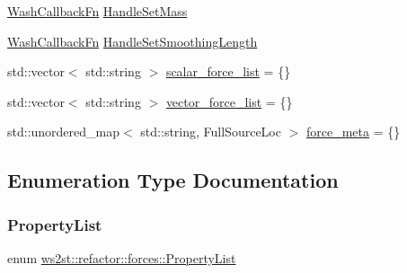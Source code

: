 \begin{DoxyCompactItemize}
\item 
\mbox{\hyperlink{namespacews2st_a682dfda40d8282c7e579a7b826a7d861}{Wash\+Callback\+Fn}} \mbox{\hyperlink{namespacews2st_1_1refactor_1_1forces_af54b981d6a8b8492f6182661addf9144}{Handle\+Set\+Mass}}
\item 
\mbox{\hyperlink{namespacews2st_a682dfda40d8282c7e579a7b826a7d861}{Wash\+Callback\+Fn}} \mbox{\hyperlink{namespacews2st_1_1refactor_1_1forces_a5a98d16b73d023d22729401f6233dccd}{Handle\+Set\+Smoothing\+Length}}
\item 
std\+::vector$<$ std\+::string $>$ \mbox{\hyperlink{namespacews2st_1_1refactor_1_1forces_a72e48f86201c44aef10b6dab331928fa}{scalar\+\_\+force\+\_\+list}} = \{\}
\item 
std\+::vector$<$ std\+::string $>$ \mbox{\hyperlink{namespacews2st_1_1refactor_1_1forces_aeca6bb9c0c85026cbbc964cc3a6c237b}{vector\+\_\+force\+\_\+list}} = \{\}
\item 
std\+::unordered\+\_\+map$<$ std\+::string, Full\+Source\+Loc $>$ \mbox{\hyperlink{namespacews2st_1_1refactor_1_1forces_a917d202a64bef4322ddadba831b71aa6}{force\+\_\+meta}} = \{\}
\end{DoxyCompactItemize}


\subsection{Enumeration Type Documentation}
\mbox{\label{namespacews2st_1_1refactor_1_1forces_aa7768922c14228c573972bab0cea0028}} 
\subsubsection{\texorpdfstring{Property\+List}{PropertyList}}
{\footnotesize\ttfamily enum \mbox{\hyperlink{namespacews2st_1_1refactor_1_1forces_aa7768922c14228c573972bab0cea0028}{ws2st\+::refactor\+::forces\+::\+Property\+List}}\hspace{0.3cm}{\ttfamily [strong]}}

